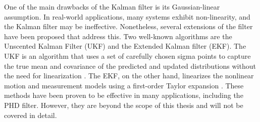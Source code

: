 One of the main drawbacks of the Kalman filter is its Gaussian-linear 
assumption. In real-world applications, many systems exhibit non-linearity, and 
the Kalman filter may be ineffective. Nonetheless, several extensions of the 
filter have been proposed that address this. Two well-known algorithms are the 
Unscented Kalman Filter (UKF) and the Extended Kalman filter (EKF). The UKF is 
an algorithm that uses a set of carefully chosen sigma points to capture the 
true mean and covariance of the predicted and updated distributions without 
the need for linearization \cite{wanUnscentedKalmanFilter2000a}. The EKF, on 
the other hand, linearizes the nonlinear motion and measurement models using a 
first-order Taylor expansion \cite{smithApplicationStatisticalFilter1962}. 
These methods have been proven to be effective in many applications, including 
the PHD filter. However, they are beyond the scope of this thesis and will not 
be covered in detail.
